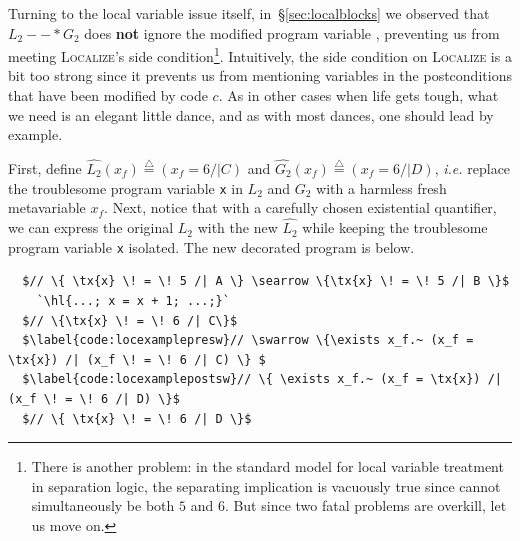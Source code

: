 \documentclass[acmsmall,screen]{acmart}
\newcommand{\li}[1]{{\texttt{\small #1}}}
\newcommand{\defeq}{\mathbin{\stackrel{\triangle}{=}}}
\newcommand{\tx}[1]{\text{#1}}
\newcommand{\infrulestyle}[1]{\textsc{#1}}
\newcommand{\hl}[1]{\colorbox{lightgray}{#1}}
\begin{document}
Turning to the local variable issue itself, in~\S\ref{sec:localblocks} we observed
that $L_2 --* G_2$ does \textbf{not} ignore the modified program variable \tx{x},
preventing us from meeting \infrulestyle{Localize}'s side condition\footnote{There is
another problem: in the standard model for local variable treatment in separation logic,
the separating implication is vacuously true since \tx{x} cannot simultaneously be
both $5$ and $6$.  But since two fatal problems are overkill, let us move on.}.
Intuitively, the side condition on \infrulestyle{Localize} is a bit too strong
since it prevents us from mentioning variables in the postconditions that have been modified
by code $c$.  As in other cases when life gets tough, what we need is an elegant little dance, and as with most dances, one should lead by example.

First, define $\hat{L_2}(x_f) \defeq (x_f \! = \! 6 /| C)$ and
$\hat{G_2}(x_f) \defeq (x_f \! = \! 6 /| D)$, \emph{i.e.} replace the troublesome program variable \li{x} in $L_2$ and $G_2$ with a harmless fresh metavariable $x_f$.  Next, notice that with a carefully chosen existential quantifier, we can express the original $L_2$ with the new $\hat{L_2}$
while keeping the troublesome program variable \li{x} isolated. 
The new decorated program is below.
\begin{lstlisting}
  $// \{ \tx{x} \! = \! 5 /| A \} \searrow \{\tx{x} \! = \! 5 /| B \}$
    `\hl{...; x = x + 1; ...;}`
  $// \{\tx{x} \! = \! 6 /| C\}$
  $\label{code:locexamplepresw}// \swarrow \{\exists x_f.~ (x_f = \tx{x}) /| (x_f \! = \! 6 /| C) \} $
  $\label{code:locexamplepostsw}// \{ \exists x_f.~ (x_f = \tx{x}) /| (x_f \! = \! 6 /| D) \}$
  $// \{ \tx{x} \! = \! 6 /| D \}$
\end{lstlisting}
\end{document}
